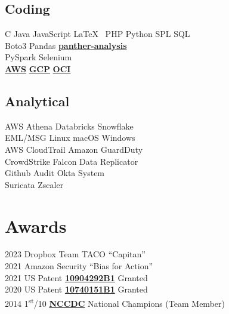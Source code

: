 \documentclass[letterpaper]{deedy-resume} %
\begin{document}
\begin{minipage}[t]{0.33\textwidth}
\subsection{Coding}
C \textbullet{} Java \textbullet{} JavaScript \textbullet{} \LaTeX\ \textbullet{} PHP \textbullet{} Python \textbullet{} SPL \textbullet{} SQL \\
Boto3 \textbullet{}  Pandas \textbullet{} \textbf{\href{https://docs.panther.com/}{panther-analysis}} \\
PySpark \textbullet{} Selenium \\
\textbf{\href{https://aws.amazon.com/}{AWS}} \textbullet{} \textbf{\href{https://console.cloud.google.com/}{GCP}} \textbullet{} \textbf{\href{https://www.oracle.com/cloud/}{OCI}}

\sectionspace %

\subsection{Analytical}
AWS Athena \textbullet{} Databricks \textbullet{} Snowflake \\
EML/MSG \textbullet{} Linux \textbullet{} macOS\textbullet{} Windows \\
AWS CloudTrail \textbullet{} Amazon GuardDuty \\
CrowdStrike Falcon Data Replicator \\
Github Audit \textbullet{} Okta System \\
Suricata \textbullet{} Zscaler \\

\sectionspace %



\section{Awards}
2023 Dropbox Team TACO “Capitan” \\
2021 Amazon Security “Bias for Action” \\
2021 US Patent \textbf{\href{https://patents.google.com/patent/US10904292B1/en}{10904292B1}} Granted \\
2020 US Patent \textbf{\href{https://patents.google.com/patent/US10740151B1/en}{10740151B1}} Granted \\
2014 1\textsuperscript{st}/10 \textbf{\href{https://www.nationalccdc.org/}{NCCDC}} National Champions (Team Member) \\


\end{minipage}
\end{document}

